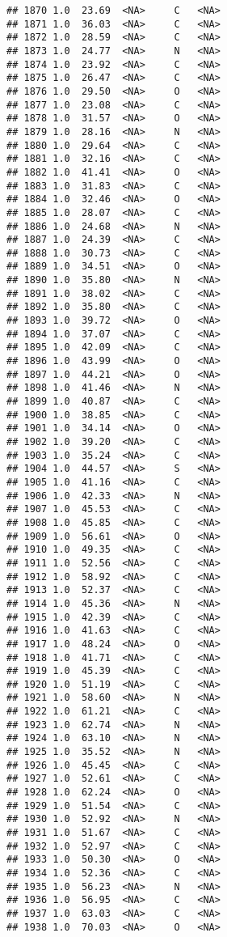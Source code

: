 \documentclass[
]{article}
\begin{document}
\begin{verbatim}
## 1870 1.0  23.69  <NA>     C   <NA>
## 1871 1.0  36.03  <NA>     C   <NA>
## 1872 1.0  28.59  <NA>     C   <NA>
## 1873 1.0  24.77  <NA>     N   <NA>
## 1874 1.0  23.92  <NA>     C   <NA>
## 1875 1.0  26.47  <NA>     C   <NA>
## 1876 1.0  29.50  <NA>     O   <NA>
## 1877 1.0  23.08  <NA>     C   <NA>
## 1878 1.0  31.57  <NA>     O   <NA>
## 1879 1.0  28.16  <NA>     N   <NA>
## 1880 1.0  29.64  <NA>     C   <NA>
## 1881 1.0  32.16  <NA>     C   <NA>
## 1882 1.0  41.41  <NA>     O   <NA>
## 1883 1.0  31.83  <NA>     C   <NA>
## 1884 1.0  32.46  <NA>     O   <NA>
## 1885 1.0  28.07  <NA>     C   <NA>
## 1886 1.0  24.68  <NA>     N   <NA>
## 1887 1.0  24.39  <NA>     C   <NA>
## 1888 1.0  30.73  <NA>     C   <NA>
## 1889 1.0  34.51  <NA>     O   <NA>
## 1890 1.0  35.80  <NA>     N   <NA>
## 1891 1.0  38.02  <NA>     C   <NA>
## 1892 1.0  35.80  <NA>     C   <NA>
## 1893 1.0  39.72  <NA>     O   <NA>
## 1894 1.0  37.07  <NA>     C   <NA>
## 1895 1.0  42.09  <NA>     C   <NA>
## 1896 1.0  43.99  <NA>     O   <NA>
## 1897 1.0  44.21  <NA>     O   <NA>
## 1898 1.0  41.46  <NA>     N   <NA>
## 1899 1.0  40.87  <NA>     C   <NA>
## 1900 1.0  38.85  <NA>     C   <NA>
## 1901 1.0  34.14  <NA>     O   <NA>
## 1902 1.0  39.20  <NA>     C   <NA>
## 1903 1.0  35.24  <NA>     C   <NA>
## 1904 1.0  44.57  <NA>     S   <NA>
## 1905 1.0  41.16  <NA>     C   <NA>
## 1906 1.0  42.33  <NA>     N   <NA>
## 1907 1.0  45.53  <NA>     C   <NA>
## 1908 1.0  45.85  <NA>     C   <NA>
## 1909 1.0  56.61  <NA>     O   <NA>
## 1910 1.0  49.35  <NA>     C   <NA>
## 1911 1.0  52.56  <NA>     C   <NA>
## 1912 1.0  58.92  <NA>     C   <NA>
## 1913 1.0  52.37  <NA>     C   <NA>
## 1914 1.0  45.36  <NA>     N   <NA>
## 1915 1.0  42.39  <NA>     C   <NA>
## 1916 1.0  41.63  <NA>     C   <NA>
## 1917 1.0  48.24  <NA>     O   <NA>
## 1918 1.0  41.71  <NA>     C   <NA>
## 1919 1.0  45.39  <NA>     C   <NA>
## 1920 1.0  51.19  <NA>     C   <NA>
## 1921 1.0  58.60  <NA>     N   <NA>
## 1922 1.0  61.21  <NA>     C   <NA>
## 1923 1.0  62.74  <NA>     N   <NA>
## 1924 1.0  63.10  <NA>     N   <NA>
## 1925 1.0  35.52  <NA>     N   <NA>
## 1926 1.0  45.45  <NA>     C   <NA>
## 1927 1.0  52.61  <NA>     C   <NA>
## 1928 1.0  62.24  <NA>     O   <NA>
## 1929 1.0  51.54  <NA>     C   <NA>
## 1930 1.0  52.92  <NA>     N   <NA>
## 1931 1.0  51.67  <NA>     C   <NA>
## 1932 1.0  52.97  <NA>     C   <NA>
## 1933 1.0  50.30  <NA>     O   <NA>
## 1934 1.0  52.36  <NA>     C   <NA>
## 1935 1.0  56.23  <NA>     N   <NA>
## 1936 1.0  56.95  <NA>     C   <NA>
## 1937 1.0  63.03  <NA>     C   <NA>
## 1938 1.0  70.03  <NA>     O   <NA>

\end{verbatim}
\end{document}
